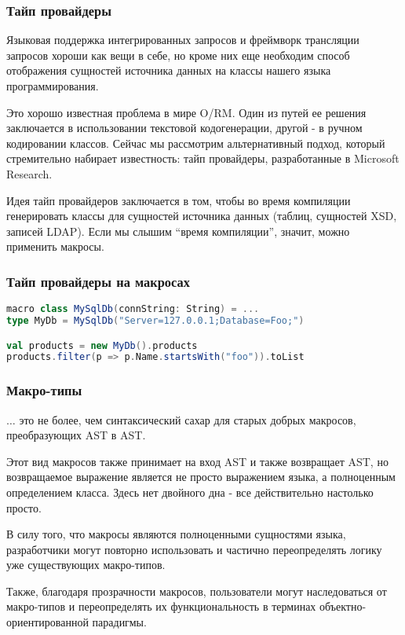\documentclass{beamer}
\begin{document}
\begin{frame}[t]
\frametitle{Тайп провайдеры}

Языковая поддержка интегрированных запросов и фреймворк трансляции запросов хороши как вещи в себе, но кроме них еще необходим способ отображения сущностей источника данных на классы нашего языка программирования.

Это хорошо известная проблема в мире O/RM. Один из путей ее решения заключается в использовании текстовой кодогенерации, другой - в ручном кодировании классов. Сейчас мы рассмотрим альтернативный подход, который стремительно набирает известность: тайп провайдеры, разработанные в Microsoft Research.

Идея тайп провайдеров заключается в том, чтобы во время компиляции генерировать классы для сущностей источника данных (таблиц, сущностей XSD, записей LDAP). Если мы слышим ``время компиляции'', значит, можно применить макросы. 
\end{frame}

\begin{frame}[t, fragile]
\frametitle{Тайп провайдеры на макросах}

\begin{lstlisting}[language=scala]
macro class MySqlDb(connString: String) = ...  
type MyDb = MySqlDb("Server=127.0.0.1;Database=Foo;") 

val products = new MyDb().products
products.filter(p => p.Name.startsWith("foo")).toList 
\end{lstlisting}

\end{frame}

\begin{frame}[t]
\frametitle{Макро-типы}

$\hdots$ это не более, чем синтаксический сахар для старых добрых макросов, преобразующих AST в AST.

Этот вид макросов также принимает на вход AST и также возвращает AST, но возвращаемое выражение является не просто выражением языка, а полноценным определением класса. Здесь нет двойного дна - все действительно настолько просто.

В силу того, что макросы являются полноценными сущностями языка, разработчики могут повторно использовать и частично переопределять логику уже существующих макро-типов.

Также, благодаря прозрачности макросов, пользователи могут наследоваться от макро-типов и переопределять их функциональность в терминах объектно-ориентированной парадигмы.
\end{frame}
\end{document}
